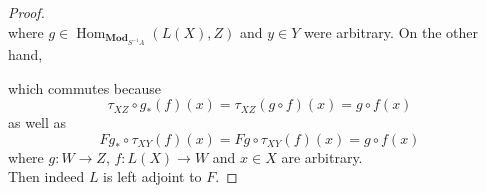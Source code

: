 \documentclass{article}
\DeclareMathOperator{\Hom}{Hom}
\newcommand{\Mod}{\mathbf{Mod}} %
\begin{document}
\begin{proof}
\[    \]
    where $g\in \Hom_{\Mod_{S^{-1}A}}(L(X),Z)$ and $y\in Y$ were arbitrary. On the other hand,
    \begin{center}
    \end{center}
    which commutes because
    \[
    \tau_{XZ}\circ g_*(f)(x)=\tau_{XZ}(g\circ f)(x)=g\circ f(x)
    \]
    as well as
    \[
    Fg_*\circ \tau_{XY}(f)(x)=Fg\circ \tau_{XY}(f)(x)=g\circ f(x)
    \]
    where $g:W\to Z$, $f:L(X)\to W$ and $x\in X$ are arbitrary.\\
    Then indeed $L$ is left adjoint to $F$.
\end{proof}
\subsection{}
\end{document}

